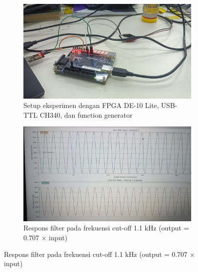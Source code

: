 \documentclass{article}
\begin{document}
\begin{figure}[H]
\centering
\begin{subfigure}{0.45\textwidth}
    \centering
    \includegraphics[width=\textwidth]{setup.png}
    \caption{Setup eksperimen dengan FPGA DE-10 Lite, USB-TTL CH340, dan function generator}
    \label{fig:setup}
\end{subfigure}
\hfill
\begin{subfigure}{0.45\textwidth}
    \centering
    \includegraphics[width=\textwidth]{cutoff.png}
    \caption{Respons filter pada frekuensi cut-off 1.1 kHz (output = 0.707 × input)}
    \label{fig:cutoff}
\end{subfigure}

\vspace{0.5cm}


\end{figure}
\end{document}
